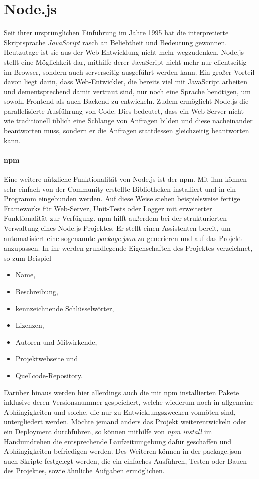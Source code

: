 \section{Node.js}
Seit ihrer ursprünglichen Einführung im Jahre 1995 hat die interpretierte Skriptsprache \emph{JavaScript} rasch an Beliebtheit und Bedeutung gewonnen.
Heutzutage ist sie aus der Web-Entwicklung nicht mehr wegzudenken.
Node.js stellt eine Möglichkeit dar, mithilfe derer JavaScript nicht mehr nur clientseitig im Browser, sondern auch serverseitig ausgeführt werden kann.
Ein großer Vorteil davon liegt darin, dass Web-Entwickler, die bereits viel mit JavaScript arbeiten und dementsprechend damit vertraut sind, nur noch eine Sprache benötigen, um sowohl Frontend als auch Backend zu entwickeln.
Zudem ermöglicht Node.js die parallelisierte Ausführung von Code.
Dies bedeutet, dass ein Web-Server nicht wie traditionell üblich eine Schlange von Anfragen bilden und diese nacheinander beantworten muss, sondern er die Anfragen stattdessen gleichzeitig beantworten kann.

\paragraph{\ac{npm}}
Eine weitere nützliche Funktionalität von Node.js ist der \acl{npm}.
Mit ihm können sehr einfach von der Community erstellte Bibliotheken installiert und in ein Programm eingebunden werden.
Auf diese Weise stehen beispielsweise fertige Frameworks für Web-Server, Unit-Tests oder Logger  mit erweiterter Funktionalität zur Verfügung.
\ac{npm} hilft außerdem bei der strukturierten Verwaltung eines Node.js Projektes.
Er stellt einen Assistenten bereit, um automatisiert eine sogenannte \emph{package.json} zu generieren und auf das Projekt anzupassen.
In ihr werden grundlegende Eigenschaften des Projektes verzeichnet, so zum Beispiel
\begin{itemize}
	\item Name,
	\item Beschreibung,
	\item kennzeichnende Schlüsselwörter,
	\item Lizenzen,
	\item Autoren und Mitwirkende,
	\item Projektwebseite und
	\item Quellcode-Repository.
\end{itemize}
Darüber hinaus werden hier allerdings auch die mit \ac{npm} installierten Pakete inklusive deren Versionsnummer gespeichert, welche wiederum noch in allgemeine Abhängigkeiten und solche, die nur zu Entwicklungszwecken vonnöten sind, untergliedert werden.
Möchte jemand anders das Projekt weiterentwickeln oder ein Deployment durchführen, so können mithilfe von \emph{npm install} im Handumdrehen die entsprechende Laufzeitumgebung dafür geschaffen und Abhängigkeiten befriedigen werden.
Des Weiteren können in der package.json auch Skripte festgelegt werden, die ein einfaches Ausführen, Testen oder Bauen des Projektes, sowie ähnliche Aufgaben ermöglichen.~\cite{package.json}


